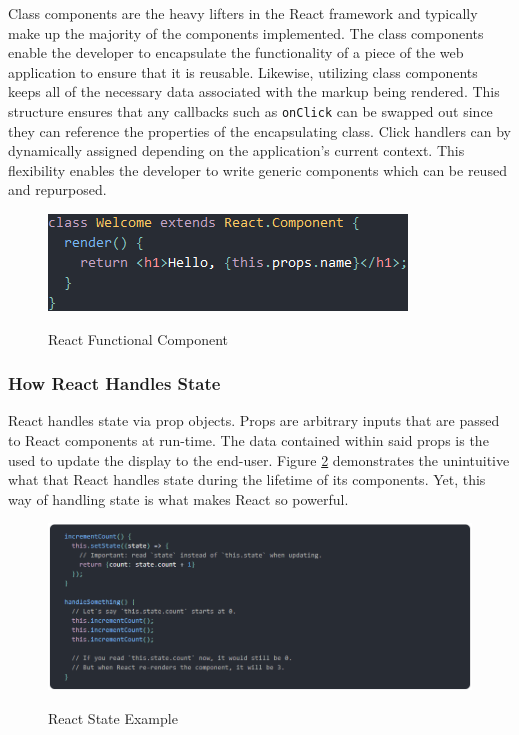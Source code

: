 \documentclass[12pt]{report}
\begin{document}
Class components are the heavy lifters in the React framework and typically make up the majority of the components implemented. The class components enable the developer to encapsulate the functionality of a piece of the web application to ensure that it is reusable. Likewise, utilizing class components keeps all of the necessary data associated with the markup being rendered. This structure ensures that any callbacks such as \texttt{onClick} can be swapped out since they can reference the properties of the encapsulating class. Click handlers can by dynamically assigned depending on the application's current context. This flexibility enables the developer to write generic components which can be reused and repurposed.

\begin{figure}[h]
	\centering
	\caption{React Functional Component}
	\includegraphics[scale=0.5]{react_class_component}
	\label{fig:reactclasscomponent}
\end{figure}

\subsubsection*{How React Handles State}

React handles state via prop objects. Props are arbitrary inputs that are passed to React components at run-time. The data contained within said props is the used to update the display to the end-user. Figure \ref{fig:reactstateexample} demonstrates the unintuitive what that React handles state during the lifetime of its components. Yet, this way of handling state is what makes React so powerful.

\begin{figure}[h]
	\centering
	\caption{React State Example}
	\includegraphics[scale=0.5]{react_state_example}
	\label{fig:reactstateexample}
\end{figure}
\end{document}
